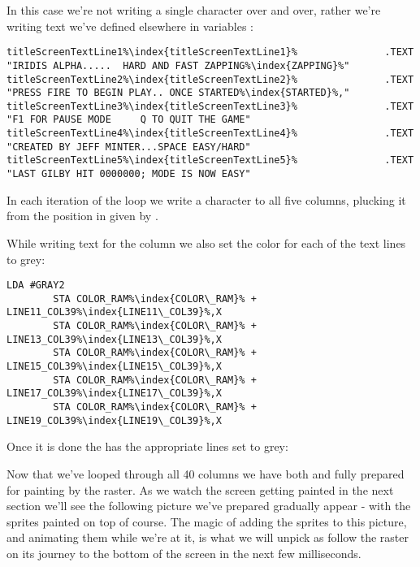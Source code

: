 In this case we're not writing a single character over and over, rather we're writing text we've defined elsewhere
in variables :

\begin{lstlisting}[basicstyle=\tiny,caption=In \icode{DrawTitleScreenText\index{DrawTitleScreenText}},escapechar=\%]
titleScreenTextLine1%\index{titleScreenTextLine1}%               .TEXT "IRIDIS ALPHA.....  HARD AND FAST ZAPPING%\index{ZAPPING}%"
titleScreenTextLine2%\index{titleScreenTextLine2}%               .TEXT "PRESS FIRE TO BEGIN PLAY.. ONCE STARTED%\index{STARTED}%,"
titleScreenTextLine3%\index{titleScreenTextLine3}%               .TEXT "F1 FOR PAUSE MODE     Q TO QUIT THE GAME"
titleScreenTextLine4%\index{titleScreenTextLine4}%               .TEXT "CREATED BY JEFF MINTER...SPACE EASY/HARD"
titleScreenTextLine5%\index{titleScreenTextLine5}%               .TEXT "LAST GILBY HIT 0000000; MODE IS NOW EASY"
\end{lstlisting}

In each iteration of the loop we write a character to all five columns, plucking it from the position in
 given by . 



While writing text for the column we also set the color for each of the text lines to grey:

\begin{lstlisting}[caption=In \icode{DrawTitleScreenText\index{DrawTitleScreenText}},escapechar=\%]
        LDA #GRAY2
        STA COLOR_RAM%\index{COLOR\_RAM}% + LINE11_COL39%\index{LINE11\_COL39}%,X
        STA COLOR_RAM%\index{COLOR\_RAM}% + LINE13_COL39%\index{LINE13\_COL39}%,X
        STA COLOR_RAM%\index{COLOR\_RAM}% + LINE15_COL39%\index{LINE15\_COL39}%,X
        STA COLOR_RAM%\index{COLOR\_RAM}% + LINE17_COL39%\index{LINE17\_COL39}%,X
        STA COLOR_RAM%\index{COLOR\_RAM}% + LINE19_COL39%\index{LINE19\_COL39}%,X
\end{lstlisting}

Once it is done the  has the appropriate lines set to grey:


Now that we've looped through all 40 columns we have both  and  fully
prepared for painting by the raster. As we watch the screen getting painted in the next section we'll see
the following picture we've prepared gradually appear - with the sprites painted on top of course. The
magic of adding the sprites to this picture, and animating them while we're at it, is what we will
unpick as follow the raster on its journey to the bottom of the screen in the next few milliseconds.

